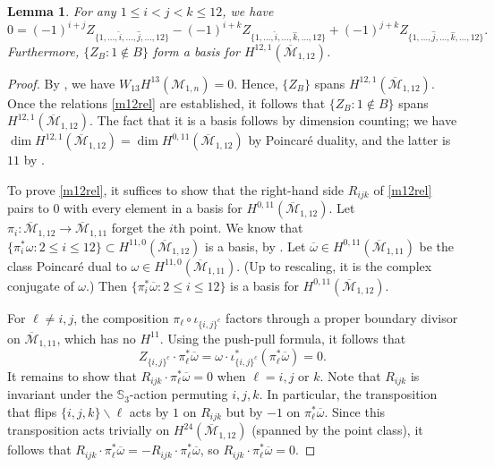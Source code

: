 \documentclass[12pt]{amsart}
\newtheorem{lem}[thm]{Lemma}
\theoremstyle{definition}
\numberwithin{equation}{section}
\newcommand{\M}{\mathcal{M}}
\newcommand{\Mb}{\overline{\M}}
\theoremstyle{definition} %
\theoremstyle{remark}
\begin{document}
\begin{lem} \label{12basis}
For any $1 \leq i < j < k \leq 12$, we have
\begin{equation} \label{m12rel} 0 = (-1)^{i+j} Z_{\{1, \ldots, \widehat{i}, \ldots, \widehat{j}, \ldots, {12}\}} - (-1)^{i+k}
Z_{\{1, \ldots, \widehat{i}, \ldots, \widehat{k}, \ldots, 12\}} + (-1)^{j+k}
Z_{\{1, \ldots, \widehat{j}, \ldots, \widehat{k}, \ldots, 12\}}.
\end{equation}
Furthermore,  $\{Z_{B}\colon 1 \notin B\}$ form a basis for $H^{12,1}(\Mb_{1,12})$. 
\end{lem}
\begin{proof} By \cite[Proposition 2.2]{CLP-STE}, we have $W_{13}H^{13}(\M_{1,n}) = 0$. Hence, $\{Z_B\}$ spans  $H^{12,1}(\Mb_{1,12})$. Once the relations \eqref{m12rel} are established, it follows that $\{Z_{B}: 1 \notin B\}$ spans $H^{12,1}(\Mb_{1,12})$. The fact that it is a basis follows by dimension counting; we have $\dim H^{12,1}(\Mb_{1,12}) = \dim H^{0,11}(\Mb_{1,12})$ by Poincar\'e duality, and the latter is $11$ by \cite{Getzler}.

To prove \eqref{m12rel}, it suffices to show that the right-hand side $R_{ijk}$ of \eqref{m12rel} pairs to $0$ with every element in a basis for $H^{0,11}(\Mb_{1,12})$.
Let $\pi_i\colon \Mb_{1,12} \to \Mb_{1,11}$ forget the $i$th point.
We know that $\{ \pi_i^*\omega : 2 \leq i \leq 12 \} \subset   H^{11,0}(\Mb_{1,12})$ 
is a basis, by \cite[Corollary 2.4]{CanningLarsonPayne}. Let $\overline{\omega} \in H^{0,11}(\Mb_{1,11})$ be the class Poincar\'e dual to $\omega \in H^{11,0}(\Mb_{1,11})$. (Up to rescaling, it is the complex conjugate of $\omega$.)
Then $\{\pi_i^*\overline{\omega} : 2 \leq i \leq 12\}$ is a
basis for $H^{0,11}(\Mb_{1,12})$.  

For $\ell \neq i, j$, the composition $\pi_{\ell} \circ \iota_{\{i,j\}^c} $ factors through a proper boundary divisor on $\Mb_{1,11}$, which has no $H^{11}$. Using the push-pull formula, it follows that
\[Z_{\{i,j\}^c} \cdot \pi_{\ell}^*\overline{\omega} = \omega \cdot \iota_{\{i,j\}^c}^*(\pi_{\ell}^*\overline{\omega}) = 0.\]
It remains to show that $R_{ijk} \cdot \pi_{\ell}^* \overline{\omega}= 0$ when $\ell = i, j$ or $k$. Note that $R_{ijk}$ is invariant under the $\mathbb{S}_3$-action permuting $i, j, k$. In particular, the transposition that flips $\{i, j, k\} \smallsetminus  \ell$ acts by $1$ on $R_{ijk}$ but by $-1$ on $\pi_{\ell}^* \overline{\omega}$. Since this transposition acts trivially on $H^{24}(\Mb_{1,12})$ (spanned by the point class), it
follows that $R_{ijk} \cdot \pi_{\ell}^*\overline{\omega} = -R_{ijk} \cdot \pi_{\ell}^*\overline{\omega}$, so 
$R_{ijk} \cdot \pi_{\ell}^*\overline{\omega}  = 0$.



\end{proof}
\end{document}
